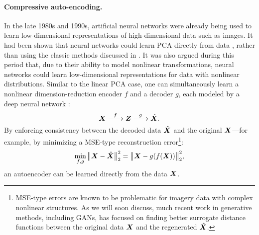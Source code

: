 \documentclass[../../book-main.tex]{subfiles}
\begin{document}
\paragraph{Compressive auto-encoding.}
In the late 1980s and 1990s, artificial neural networks were already being used to learn low-dimensional representations of high-dimensional data such as images. It had been shown that neural networks could learn PCA directly from data \cite{Oja1982SimplifiedNM,Baldi89}, rather than using the classic methods discussed in . It was also argued during this period that, due to their ability to model nonlinear transformations, neural networks could learn low-dimensional representations for data with nonlinear distributions. Similar to the linear PCA case, one can simultaneously learn a nonlinear dimension-reduction encoder $f$ and a decoder $g$, each modeled by a deep neural network \cite{Rumelhart1986,Kramer1991NonlinearPC}:
\begin{equation}
    \bm{X}   \xrightarrow{\hspace{2mm} f \hspace{2mm}} \bm{Z}  \xrightarrow{\hspace{2mm} g \hspace{2mm}} \hat {\bm{X}}.
       \label{eqn:auto-encoding-deep-networks}
\end{equation}
By enforcing consistency between the decoded data $\hat {\bm{X}}$ and the original $\bm{X}$---for example, by minimizing a MSE-type reconstruction error\footnote{MSE-type errors are known to be problematic for imagery data with complex nonlinear structures. As we will soon discuss, much recent work in generative methods, including GANs, has focused on finding better surrogate distance functions between the original data $\bm{X}$ and the regenerated $\hat {\bm{X}}$.}:
\begin{equation}
    \min_{f,g} \big\|\bm{X} - \hat {\bm{X}}\big\|_2^2 = \big\|\bm{X} - g(f( \bm{X}))\big\|_2^2,
\end{equation}
an autoencoder can be learned directly from the data $\bm{X}$.
\end{document}
